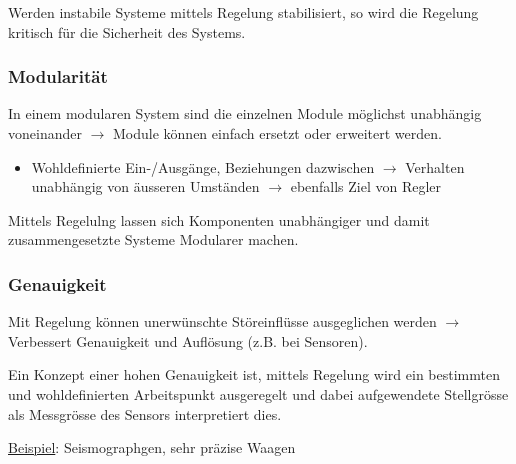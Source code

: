 \documentclass[
  10pt,
  a4paper,
  twocolumn]{article}
\providecommand{\tightlist}{%
  \setlength{\itemsep}{0pt}\setlength{\parskip}{0pt}}\usepackage{longtable,booktabs,array}
\numberwithin{equation}{section}
\begin{document}
\begin{tcolorbox}[enhanced jigsaw, bottomtitle=1mm, title=\textcolor{quarto-callout-warning-color}{\faExclamationTriangle}\hspace{0.5em}{Safety Critical}, arc=.35mm, rightrule=.15mm, toprule=.15mm, opacitybacktitle=0.6, coltitle=black, bottomrule=.15mm, toptitle=1mm, colframe=quarto-callout-warning-color-frame, colbacktitle=quarto-callout-warning-color!10!white, breakable, titlerule=0mm, leftrule=.75mm, left=2mm, opacityback=0, colback=white]

Werden instabile Systeme mittels Regelung stabilisiert, so wird die
Regelung kritisch für die Sicherheit des Systems.

\end{tcolorbox}

\hypertarget{modularituxe4t}{%
\subsubsection{Modularität}\label{modularituxe4t}}

In einem modularen System sind die einzelnen Module möglichst unabhängig
voneinander \(\rightarrow\) Module können einfach ersetzt oder erweitert
werden.

\begin{itemize}
\tightlist
\item
  Wohldefinierte Ein-/Ausgänge, Beziehungen dazwischen \(\rightarrow\)
  Verhalten unabhängig von äusseren Umständen \(\rightarrow\) ebenfalls
  Ziel von Regler
\end{itemize}

Mittels Regelulng lassen sich Komponenten unabhängiger und damit
zusammengesetzte Systeme Modularer machen.

\hypertarget{genauigkeit}{%
\subsubsection{Genauigkeit}\label{genauigkeit}}

Mit Regelung können unerwünschte Störeinflüsse ausgeglichen werden
\(\rightarrow\) Verbessert Genauigkeit und Auflösung (z.B. bei
Sensoren).

\begin{tcolorbox}[enhanced jigsaw, bottomtitle=1mm, title=\textcolor{quarto-callout-note-color}{\faInfo}\hspace{0.5em}{Anwendungen}, arc=.35mm, rightrule=.15mm, toprule=.15mm, opacitybacktitle=0.6, coltitle=black, bottomrule=.15mm, toptitle=1mm, colframe=quarto-callout-note-color-frame, colbacktitle=quarto-callout-note-color!10!white, breakable, titlerule=0mm, leftrule=.75mm, left=2mm, opacityback=0, colback=white]

Ein Konzept einer hohen Genauigkeit ist, mittels Regelung wird ein
bestimmten und wohldefinierten Arbeitspunkt ausgeregelt und dabei
aufgewendete Stellgrösse als Messgrösse des Sensors interpretiert dies.

\ul{Beispiel}: Seismographgen, sehr präzise Waagen

\end{tcolorbox}
\end{document}
